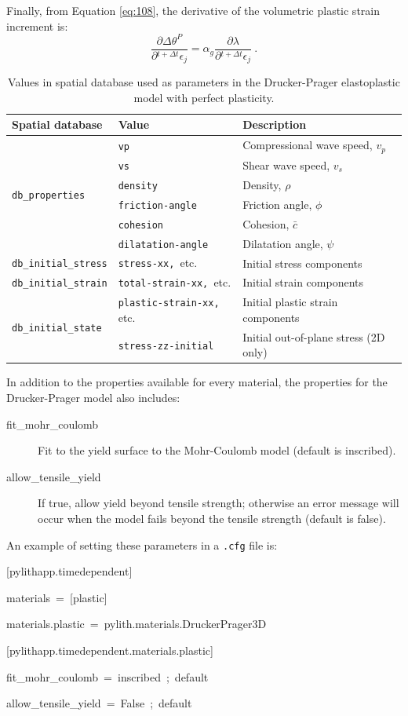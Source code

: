 Finally, from Equation \vref{eq:108}, the derivative of the volumetric
plastic strain increment is:
\begin{equation}
\frac{\partial\Delta\theta^{P}}{\partial\phantom{}^{t+\Delta t}\epsilon_{j}}=\alpha_{g}\frac{\partial\lambda}{\partial\phantom{}^{t+\Delta t}\epsilon_{j}}\:.\label{eq:126}
\end{equation}
\begin{table}
\centering{}\caption{\label{tab:druckerPrager}Values in spatial database used as parameters
in the Drucker-Prager elastoplastic model with perfect plasticity.}
\begin{tabular}{|l|l|l|}
\hline 
\textbf{Spatial database} & \textbf{Value} & \textbf{Description}\tabularnewline
\hline 
\hline 
\multirow{6}{*}{\texttt{db\_properties}} & \texttt{vp} & Compressional wave speed, $v_{p}$\tabularnewline
\cline{2-3} 
 & \texttt{vs} & Shear wave speed, $v_{s}$\tabularnewline
\cline{2-3} 
 & \texttt{density} & Density, $\rho$\tabularnewline
\cline{2-3} 
 & \texttt{friction-angle} & Friction angle, $\phi$\tabularnewline
\cline{2-3} 
 & \texttt{cohesion} & Cohesion, $\bar{c}$\tabularnewline
\cline{2-3} 
 & \texttt{dilatation-angle} & Dilatation angle, $\psi$\tabularnewline
\hline 
\texttt{db\_initial\_stress} & \texttt{stress-xx, }etc. & Initial stress components\tabularnewline
\hline 
\texttt{db\_initial\_strain} & \texttt{total-strain-xx, }etc. & Initial strain components\tabularnewline
\hline 
\multirow{2}{*}{\texttt{db\_initial\_state}} & \texttt{plastic-strain-xx, }etc. & Initial plastic strain components\tabularnewline
\cline{2-3} 
 & \texttt{stress-zz-initial} & Initial out-of-plane stress (2D only)\tabularnewline
\hline 
\end{tabular}
\end{table}


In addition to the properties available for every material, the properties
for the Drucker-Prager model also includes:
\begin{description}
\item [{fit\_mohr\_coulomb}] Fit to the yield surface to the Mohr-Coulomb
model (default is inscribed).
\item [{allow\_tensile\_yield}] If true, allow yield beyond tensile strength;
otherwise an error message will occur when the model fails beyond
the tensile strength (default is false).
\end{description}
An example of setting these parameters in a \texttt{.cfg} file is:
\begin{lyxcode}
{[}pylithapp.timedependent{]}

materials~=~{[}plastic{]}

materials.plastic~=~pylith.materials.DruckerPrager3D



{[}pylithapp.timedependent.materials.plastic{]}

fit\_mohr\_coulomb~=~inscribed~;~default

allow\_tensile\_yield~=~False~;~default\end{lyxcode}

